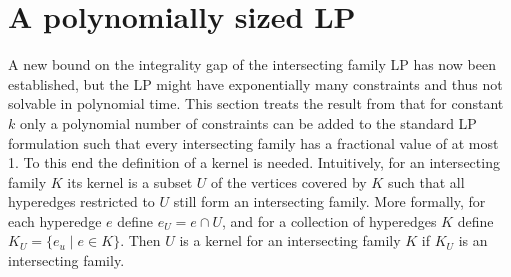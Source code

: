
\section{A polynomially sized LP}\label{sec:SizeLP}

A new bound on the integrality gap of the intersecting family LP has now been established, but the LP might have exponentially many constraints and thus not solvable in polynomial time. This section treats the result from \cite{LapChiLau} that for constant $k$ only a polynomial number of constraints can be added to the standard LP formulation such that every intersecting family has a fractional value of at most 1. To this end the definition of a kernel is needed. Intuitively, for an intersecting family $K$ its kernel is a subset $U$ of the vertices covered by $K$ such that all hyperedges restricted to $U$ still form an intersecting family. More formally, for each hyperedge $e$ define $e_U = e \cap U$, and for a collection of hyperedges $K$ define $K_U = \{ e_u \mid e \in K \}$. Then $U$ is a kernel for an intersecting family $K$ if $K_U$ is an intersecting family.

